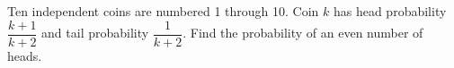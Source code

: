 Ten independent coins are numbered 1 through 10. Coin $ k $ has head probability $\dfrac{k+1}{k+2}$ and tail probability $\dfrac{1}{k+2}$. Find the probability of an even number of heads.
